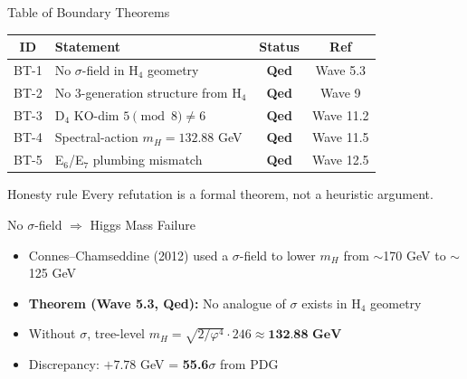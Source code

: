 \documentclass[aspectratio=169,11pt]{beamer}
\newcommand{\ph}{\varphi}
\begin{document}
\begin{frame}{Table of Boundary Theorems}
  \begin{center}
    \begin{tabular}{clcc}
      \toprule
      ID & Statement & Status & Ref \\
      \midrule
      BT-1 & No $\sigma$-field in H$_4$ geometry & \textbf{Qed} & Wave 5.3 \\
      BT-2 & No 3-generation structure from H$_4$ & \textbf{Qed} & Wave 9 \\
      BT-3 & D$_4$ KO-dim $5 \pmod 8 \neq 6$ & \textbf{Qed} & Wave 11.2 \\
      BT-4 & Spectral-action $m_H = 132.88$ GeV & \textbf{Qed} & Wave 11.5 \\
      BT-5 & E$_6$/E$_7$ plumbing mismatch & \textbf{Qed} & Wave 12.5 \\
      \bottomrule
    \end{tabular}
  \end{center}
  \vfill
  \begin{block}{Honesty rule}
    Every refutation is a formal theorem, not a heuristic argument.
  \end{block}
\end{frame}

\begin{frame}{No $\sigma$-field $\Rightarrow$ Higgs Mass Failure}
  \begin{itemize}
    \item Connes--Chamseddine (2012) used a $\sigma$-field to lower $m_H$ from $\sim$170 GeV to $\sim$125 GeV
    \item \textbf{Theorem (Wave 5.3, Qed):} No analogue of $\sigma$ exists in H$_4$ geometry
    \item Without $\sigma$, tree-level $m_H = \sqrt{2/\ph^4}\cdot 246 \approx \textbf{132.88 GeV}$
    \item Discrepancy: $+7.78$ GeV = \textbf{55.6$\sigma$} from PDG
  \end{itemize}
  \vfill
  \begin{center}
  \end{center}
\end{frame}
\end{document}
